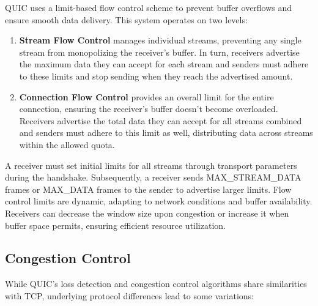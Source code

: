 QUIC uses a limit-based flow control scheme to prevent buffer overflows and ensure smooth data delivery. This system operates on two levels:
\begin{enumerate}
    \item \textbf{Stream Flow Control} manages individual streams, preventing any single stream from monopolizing the receiver's buffer. In turn, receivers advertise the maximum data they can accept for each stream and senders must adhere to these limits and stop sending when they reach the advertised amount.
    \item \textbf{Connection Flow Control} provides an overall limit for the entire connection, ensuring the receiver's buffer doesn't become overloaded. Receivers advertise the total data they can accept for all streams combined and senders must adhere to this limit as well, distributing data across streams within the allowed quota.
\end{enumerate}
A receiver must set initial limits for all streams through transport parameters during the handshake. Subsequently, a receiver sends MAX\_STREAM\_DATA frames or MAX\_DATA frames to the sender to advertise larger limits. Flow control limits are dynamic, adapting to network conditions and buffer availability. Receivers can decrease the window size upon congestion or increase it when buffer space permits, ensuring efficient resource utilization.

\subsection{Congestion Control} \label{congestion_control}

While QUIC's loss detection and congestion control algorithms share similarities with TCP, underlying protocol differences lead to some
variations\cite{rfc9002}:

